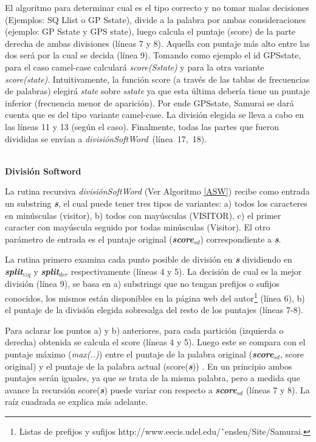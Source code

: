 El algoritmo para determinar cual es el tipo correcto y no tomar malas decisiones (Ejemplos: \textsf{SQ Llist} o \textsf{GP Sstate}), divide a la palabra por ambas consideraciones (ejemplo: \textsf{GP Sstate} y \textsf{GPS state}), luego calcula el puntaje (score) de la parte derecha de ambas divisiones (líneas 7 y 8). Aquella con puntaje más alto entre las dos será por la cual se decida (línea 9). Tomando como ejemplo el id \textsf{GPSstate}, para el caso camel-case calculará \mbox{\textit{score(Sstate)}} y para la otra variante \textit{score(state)}. Intuitivamente, la función score (a través de las tablas de frecuencias de palabras) elegirá \textit{state} sobre \textit{sstate} ya que esta última debería tiene un puntaje inferior (frecuencia menor de aparición). Por ende \textsf{GPSstate}, Samurai se dará cuenta que es del tipo variante camel-case. La división elegida se lleva a cabo en las líneas 11 y 13 (según el caso).
Finalmente, todas las partes que fueron divididas se envían a \mbox{\textit{divisiónSoftWord} (línea 17, 18)}.

\noindent \textbf{\\División Softword\\}

La rutina recursiva \textit{divisiónSoftWord} (Ver Algoritmo \ref{ASW}) recibe como entrada un substring \textbf{\textit{s}}, el cual puede tener tres tipos de variantes: a) todos los caracteres en minúsculas (\textsf{visitor}), b) todos con mayúsculas (\textsf{VISITOR}), c) el primer caracter con mayúscula seguido por todas minúsculas (\textsf{Visitor}). El otro parámetro de entrada es el puntaje original (\textbf{\textit{score$_{sd}$}}) correspondiente a \textbf{\textit{s}}.

La rutina primero examina cada punto posible de división en \textbf{\textit{s}} dividiendo en \textbf{\textit{split$_{izq}$}} y \textbf{\textit{split$_{der}$}} respectivamente (líneas 4 y 5). La decisión de cual es la mejor división (línea 9), se basa en a) substrings que no tengan prefijos o sufijos conocidos, los mismos están disponibles en la página web del autor\footnote[1]{Listas de prefijos y sufijos  http://www.eecis.udel.edu/˜enslen/Site/Samurai.} (línea 6), b) el puntaje de la división elegida sobresalga del resto de los puntajes (líneas 7-8).

Para aclarar los puntos a) y b) anteriores, para cada partición (izquierda o derecha) obtenida se calcula el score (líneas 4 y 5). Luego este se compara con el puntaje máximo (\textit{max(..)}) entre el puntaje de la palabra original (\textbf{\textit{score$_{sd}$}}, score original) y el puntaje de la palabra actual (score(\textbf{\textit{s}})) . En un principio ambos puntajes serán iguales, ya que se trata de la misma palabra, pero a medida que avance la recursión score(\textbf{\textit{s}}) puede variar con respecto a \textbf{\textit{score$_{sd}$}} (líneas 7 y 8). La raíz cuadrada se explica más adelante.

